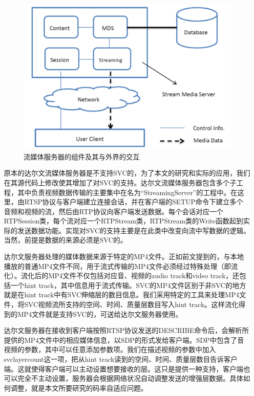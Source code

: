 \begin{figure}[t]
	\centering
	\includegraphics[width = 1.0\linewidth]{figures/streaming-server.png}
	\caption{流媒体服务器的组件及其与外界的交互\label{fig:streaming-server}}
\end{figure}

原本的达尔文流媒体服务器是不支持SVC的，为了本文的研究和实际的应用，我们在其源代码上修改使其增加了对SVC的支持。达尔文流媒体服务器包含多个子工程，其中负责视频数据传输的主要集中在名为“StreamingServer”的工程中。在这里，由RTSP协议与客户端建立连接会话，并在客户端的SETUP命令下建立多个音频和视频的流，然后由RTP协议向客户端发送数据。每个会话对应一个RTPSession类，每个流对应一个RTPStream类，RTPStream类的Write函数起到实际的发送数据功能。实现对SVC的支持主要是在此类中改变向流中写数据的逻辑。当然，前提是数据的来源必须是SVC的。

达尔文服务器处理的媒体数据来源于特定的MP4文件。正如前文提到的，与本地播放的普通MP4文件不同，用于流式传输的MP4文件必须经过特殊处理（即流化）。流化后的MP4文件不仅包括对应音、视频的audio track和video track，还包括一个hint track，其中信息用于流式传输。SVC的MP4文件区别于非SVC的地方就是在hint track中有SVC伸缩层的数目信息。我们采用特定的工具来处理MP4文件，将SVC视频流所支持的空间、时间、质量层数目写入hint track。这样流化得到的MP4文件就是支持SVC的，可送给达尔文服务器使用。

达尔文服务器在接收到客户端按照RTSP协议发送的DESCRIBE命令后，会解析所提供的MP4文件中的相应媒体信息，以SDP的形式发给客户端。SDP中包含了音视频的参数，其中可以任意添加参数项。我们在描述视频的参数中加入svclayercount这一项，把从hint track读到的空间、时间、质量层数目告诉客户端。这就使得客户端可以主动设置想要接收的层。这只是提供一种支持，客户端也可以完全不主动设置，服务器会根据网络状况自动调整发送的增强层数据。具体如何调整，就是本文所要研究的码率自适应问题。

